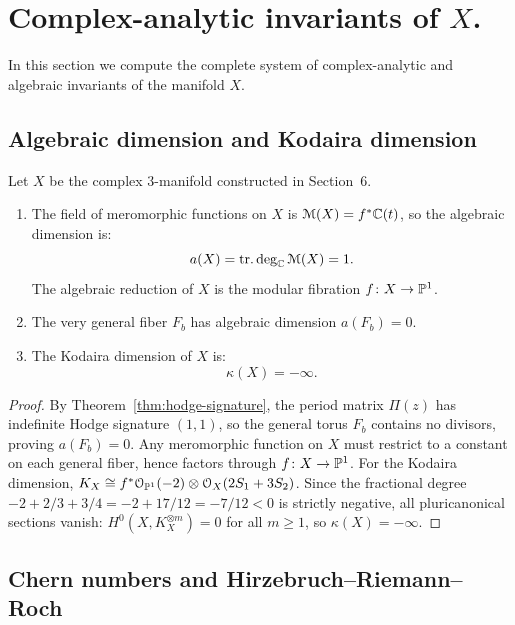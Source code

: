 \section{Complex-analytic invariants of $X$.}

In this section we compute the complete system of complex-analytic and algebraic invariants of the manifold $X$.

\subsection{Algebraic dimension and Kodaira dimension}

\begin{theorem}\label{thm:algebraic-invariants}
Let $X$ be the complex $3$-manifold constructed in Section~6.
\begin{enumerate}[label=(\roman*)]
    \item The field of meromorphic functions on $X$ is $\mathcal{M}(X) = f^*\mathbb{C}(t)$, so the algebraic dimension is:
    \[
    a(X) = \operatorname{tr.deg}_{\mathbb{C}} \mathcal{M}(X) = 1.
    \]
    The algebraic reduction of $X$ is the modular fibration $f \colon X \to \mathbb{P}^1$.
    \item The very general fiber $F_b$ has algebraic dimension $a(F_b) = 0$.
    \item The Kodaira dimension of $X$ is:
    \[
    \kappa(X) = -\infty.
    \]
\end{enumerate}
\end{theorem}

\begin{proof}
By Theorem~\ref{thm:hodge-signature}, the period matrix $\Pi(z)$ has indefinite Hodge signature $(1,1)$, so the general torus $F_b$ contains no divisors, proving $a(F_b) = 0$.
Any meromorphic function on $X$ must restrict to a constant on each general fiber, hence factors through $f \colon X \to \mathbb{P}^1$.
For the Kodaira dimension, $K_X \cong f^*\mathcal{O}_{\mathbb{P}^1}(-2) \otimes \mathcal{O}_X(2S_1 + 3S_2)$.
Since the fractional degree $-2 + 2/3 + 3/4 = -2 + 17/12 = -7/12 < 0$ is strictly negative, all pluricanonical sections vanish: $H^0(X, K_X^{\otimes m}) = 0$ for all $m \ge 1$, so $\kappa(X) = -\infty$.
\end{proof}

\subsection{Chern numbers and Hirzebruch--Riemann--Roch}

